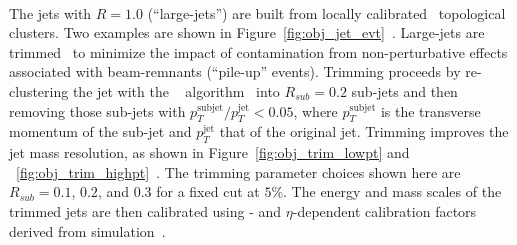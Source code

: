 \paragraph{}
The jets with $R=1.0$ (``large-\R jets'') are built from locally calibrated~\cite{Aad:2011he} topological clusters.
Two examples are shown in Figure~\ref{fig:obj_jet_evt}~\cite{ATLAS-CONF-2015-035}.
Large-\R jets are trimmed~\cite{Krohn2010} to minimize the impact of contamination from non-perturbative effects associated with beam-remnants (``pile-up'' events).
Trimming proceeds by re-clustering the jet with the \kt~ algorithm~\cite{Ellis:1993tq} into $R_{sub} = 0.2$ sub-jets and then removing those sub-jets with $p_T^{\mathrm{subjet}}/p_T^{\mathrm{jet}} < 0.05$, where $p_T^{\mathrm{subjet}}$ is the transverse momentum of the sub-jet and $p_T^{\mathrm{jet}}$ that of the original jet.
Trimming improves the jet mass resolution, as shown in Figure~\ref{fig:obj_trim_lowpt} and ~\ref{fig:obj_trim_highpt}~\cite{ATL-PHYS-PUB-2017-020}. 
The trimming parameter choices shown here are $R_{sub} = 0.1$, $0.2$, and $0.3$ for a fixed cut at $5\%$.
The energy and mass scales of the trimmed jets are then calibrated using \pt- and $\eta$-dependent calibration factors derived from simulation~\cite{PERF-2012-02}.

